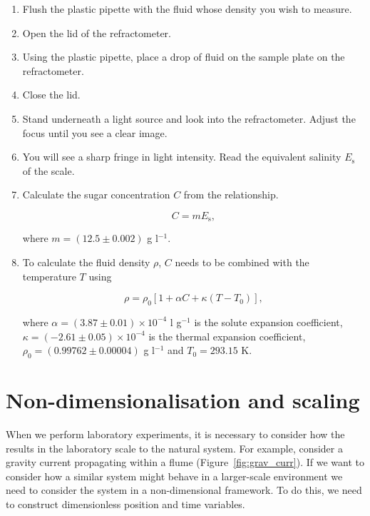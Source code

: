 \documentclass[]{article}
\theoremstyle{definition}
\begin{document}
\begin{enumerate}
\item Flush the plastic pipette with the fluid whose density you wish to measure.
\item Open the lid of the refractometer.
\item Using the plastic pipette, place a drop of fluid on the sample plate on the refractometer.
\item Close the lid.
\item Stand underneath a light source and look into the refractometer. Adjust the focus until you see a clear image.
\item You will see a sharp fringe in light intensity. Read the equivalent salinity $E_{\text{s}}$ of the scale.
\item Calculate the sugar concentration $C$ from the relationship.
  
  \begin{equation}
    \label{equ:equi_sal}
    C = m E_{\text{s}},
  \end{equation}

  where $m = (12.5 \pm 0.002)$ g l$^{-1}$.
\item To calculate the fluid density $\rho$, $C$ needs to be combined with the temperature $T$ using

  \begin{equation}
    \label{equ:dens_model}
    \rho = \rho_{0} [1 + \alpha C+ \kappa (T - T_{0})],
  \end{equation}

  where $\alpha = (3.87 \pm 0.01) \times 10^{-4}$ l g$^{-1}$ is the solute expansion coefficient, $\kappa = (-2.61 \pm 0.05) \times 10^{-4}$ is the thermal expansion coefficient, $\rho_{0} = (0.99762 \pm 0.00004)$ g l$^{-1}$ and $T_{0} = 293.15$ K. 
\end{enumerate}

\section{Non-dimensionalisation and scaling}
\label{app:non_dim}

When we perform laboratory experiments, it is necessary to consider how the results in the laboratory scale to the natural system. For example, consider a gravity current propagating within a flume (Figure~\ref{fig:grav_curr}). If we want to consider how a similar system might behave in a larger-scale environment we need to consider the system in a non-dimensional framework. To do this, we need to construct dimensionless position and time variables. 
\end{document}

